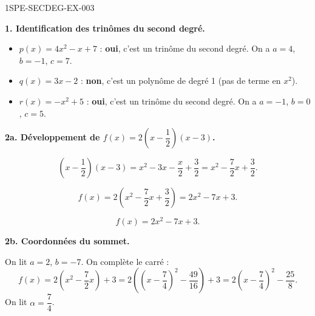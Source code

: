 \begin{corrige}{1SPE-SECDEG-EX-003}

\textbf{1. Identification des trinômes du second degré.}


\begin{itemize}
  \item $p(x) = 4x^2 - x + 7$ : \textbf{oui}, c'est un trinôme du second degré. On a $a = 4$, $b = -1$, $c = 7$.
  \item $q(x) = 3x - 2$ : \textbf{non}, c'est un polynôme de degré 1 (pas de terme en $x^2$).
  \item $r(x) = -x^2 + 5$ : \textbf{oui}, c'est un trinôme du second degré. On a $a = -1$, $b = 0$, $c = 5$.
\end{itemize}

\medskip
\textbf{2a. Développement de $f(x) = 2\!\left(x - \dfrac{1}{2}\right)\!(x - 3)$.}


\[\left(x - \frac{1}{2}\right)(x - 3) = x^2 - 3x - \frac{x}{2} + \frac{3}{2} = x^2 - \frac{7}{2}x + \frac{3}{2}.\]

\[f(x) = 2\!\left(x^2 - \frac{7}{2}x + \frac{3}{2}\right) = 2x^2 - 7x + 3.\]

\[\boxed{f(x) = 2x^2 - 7x + 3.}\]

\medskip
\textbf{2b. Coordonnées du sommet.}

On lit $a = 2$, $b = -7$. On complète le carré :
\[f(x)=2\left(x^2-\frac{7}{2}x\right)+3=2\left(\left(x-\frac{7}{4}\right)^2-\frac{49}{16}\right)+3=2\left(x-\frac{7}{4}\right)^2-\frac{25}{8}.\]
On lit $\alpha=\dfrac{7}{4}$.


\end{corrige}
